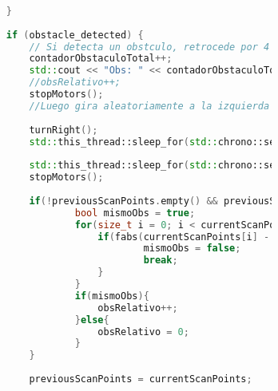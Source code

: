 \begin{lstlisting}[language={C++}, caption={Primera versi\'on del c\'odigo del sistema de control del robot}, label={Script}]
                            
                        }
                        
                        if (obstacle_detected) {
                            // Si detecta un obstculo, retrocede por 4 segundos
                            contadorObstaculoTotal++;
                            std::cout << "Obs: " << contadorObstaculoTotal << std::endl;
                            //obsRelativo++;
                            stopMotors();
                            //Luego gira aleatoriamente a la izquierda o derecha
                            
                            turnRight();
                            std::this_thread::sleep_for(std::chrono::seconds(5));
                        
                            std::this_thread::sleep_for(std::chrono::seconds(2));
                            stopMotors();
                            
                            if(!previousScanPoints.empty() && previousScanPoints.size() == currentScanPoints.size()){
                                    bool mismoObs = true;
                                    for(size_t i = 0; i < currentScanPoints.size(); ++i){
                                        if(fabs(currentScanPoints[i] - previousScanPoints[i]) > 0.05){
                                                mismoObs = false;
                                                break;
                                        }
                                    }
                                    if(mismoObs){
                                        obsRelativo++;
                                    }else{
                                        obsRelativo = 0;
                                    }
                            }
                            
                            previousScanPoints = currentScanPoints;
                            

\end{lstlisting}
